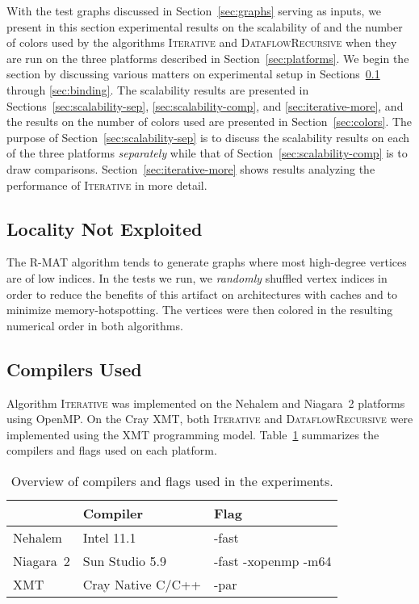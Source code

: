 \documentclass{article}
\begin{document}
With the test graphs discussed in Section~\ref{sec:graphs} serving as inputs, 
we present in this section experimental results on the scalability of and the number of colors 
used  by the algorithms \textsc{Iterative} and \textsc{DataflowRecursive}
when they are run on the three platforms described in Section~\ref{sec:platforms}. 
We begin the section by discussing various matters on experimental setup 
in Sections~\ref{sec:locality} through \ref{sec:binding}.
The scalability results are presented in 
Sections~\ref{sec:scalability-sep}, \ref{sec:scalability-comp}, and \ref{sec:iterative-more}, 
and the results on the number of colors used are presented in Section~\ref{sec:colors}.
The purpose of Section~\ref{sec:scalability-sep} is to discuss the
scalability results on each of the three platforms {\em separately} while that of
Section~\ref{sec:scalability-comp} is to draw comparisons.
Section~\ref{sec:iterative-more} shows results analyzing the performance of 
\textsc{Iterative} in more detail.

\subsection{Locality Not Exploited}
\label{sec:locality}

The R-MAT algorithm tends to generate graphs where most high-degree vertices are of low indices.  
In the tests we run, we {\em randomly} shuffled  vertex indices in order to reduce
the benefits of this artifact  on architectures with caches and to minimize memory-hotspotting.
The vertices were then colored in the resulting numerical order in both algorithms. 

\subsection{Compilers Used}
\label{sec:compilers}
Algorithm \textsc{Iterative} was implemented on the Nehalem and Niagara~2  platforms using OpenMP.
On the Cray XMT, both  \textsc{Iterative} and \textsc{DataflowRecursive} were 
implemented using the XMT programming model.
Table~\ref{t:compilers} summarizes the compilers and flags used on each platform.
\begin{table}
\begin{footnotesize}
\centering
\begin{tabular}{l|ll}
& Compiler & Flag \\ \hline
Nehalem & Intel 11.1 & -fast \\
Niagara~2 & Sun Studio 5.9 & -fast -xopenmp -m64 \\
XMT & Cray Native C/C++  & -par  
\end{tabular}
\caption{Overview of compilers and flags used in the experiments.}
\label{t:compilers}
\end{footnotesize}
\end{table}
\end{document}
